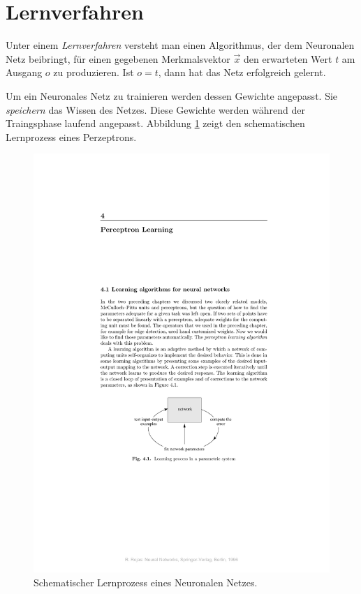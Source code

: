 \section*{Lernverfahren}
Unter einem \emph{Lernverfahren} versteht man einen Algorithmus, der dem Neuronalen Netz beibringt, für einen gegebenen Merkmalsvektor $\vec{x}$ den erwarteten Wert $t$ am Ausgang $o$ zu produzieren. Ist $o = t$, dann hat das Netz erfolgreich gelernt.

Um ein Neuronales Netz zu trainieren werden dessen Gewichte angepasst. Sie \textit{speichern} das Wissen des Netzes. Diese Gewichte werden während der Traingsphase laufend angepasst. Abbildung \ref{fig:perzeptron-learning} zeigt den schematischen Lernprozess eines Perzeptrons.

\begin{figure}[ht!] \centering 
	\includegraphics[width=\linewidth]{figures/ch02_perzeptron-learning.pdf}
	\caption{Schematischer Lernprozess eines Neuronalen Netzes.}
	\label{fig:perzeptron-learning}
\end{figure}

